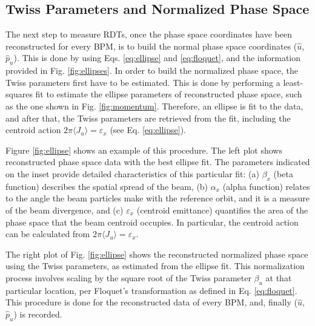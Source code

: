 \subsection{Twiss Parameters and Normalized Phase Space}

The next step to measure RDTs, once the phase space coordinates have been reconstructed for every BPM, is to build the normal phase space coordinates ($\hat{u}$,$\hat{p}_u$). This is done by using Eqs. \ref{eq:ellipse} and \ref{eq:floquet}, and the information provided in Fig. \ref{fig:ellipses}. In order to build the normalized phase space, the Twiss parameters first have to be estimated. This is done by performing a least-squares fit to estimate the ellipse parameters of reconstructed phase space, such as the one shown in Fig. \ref{fig:momentum}. Therefore, an ellipse is fit to the data, and after that, the Twiss parameters are retrieved from the fit, including the centroid action $2 \pi \langle J_u \rangle =\varepsilon_x $ (see Eq. \ref{eq:ellipse}). 

Figure \ref{fig:ellipse} shows an example of this procedure. The left plot shows reconstructed phase space data with the best ellipse fit. The parameters indicated on the inset provide detailed characteristics of this particular fit: (a) $\beta_x$ (beta function) describes the spatial spread of the beam, (b) $\alpha_x$ (alpha function) relates to the angle the beam particles make with the reference orbit, and it is a measure of the beam divergence, and (c) $\varepsilon_x$ (centroid emittance) quantifies the area of the phase space that the beam centroid occupies. In particular, the centroid action can be calculated from $2 \pi \langle J_u \rangle =\varepsilon_x $.

The right plot of Fig. \ref{fig:ellipse} shows the reconstructed normalized phase space using the Twiss parameters, as estimated from the ellipse fit. This normalization process involves scaling by the square root of the Twiss parameter $\beta_u$ at that particular location, per Floquet's transformation as defined in Eq. \ref{eq:floquet}. This procedure is done for the reconstructed data of every BPM, and, finally ($\hat{u}$,$\hat{p}_u$) is recorded.  

